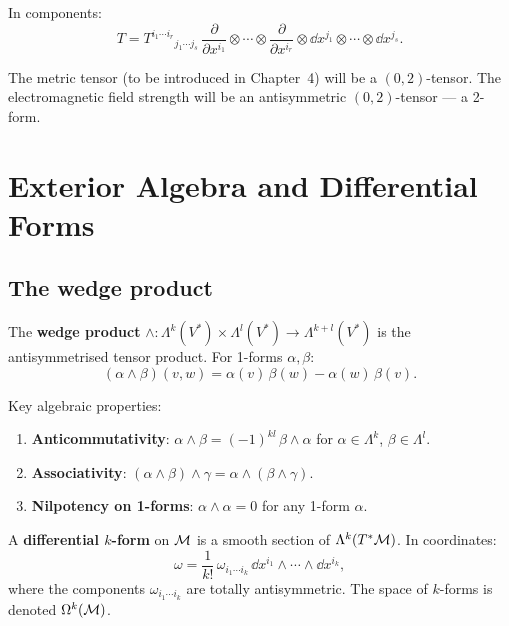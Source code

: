In components:
\begin{equation}
T = T^{i_1 \cdots i_r}{}_{j_1 \cdots j_s}\, \frac{\partial}{\partial x^{i_1}} \otimes \cdots \otimes \frac{\partial}{\partial x^{i_r}} \otimes \dd x^{j_1} \otimes \cdots \otimes \dd x^{j_s}.
\end{equation}

The metric tensor (to be introduced in Chapter~4) will be a $(0,2)$-tensor. The electromagnetic field strength will be an antisymmetric $(0,2)$-tensor --- a 2-form.

\section{Exterior Algebra and Differential Forms}

\subsection{The wedge product}

\begin{definition}
The \textbf{wedge product} $\wedge: \Lambda^k(V^*) \times \Lambda^l(V^*) \to \Lambda^{k+l}(V^*)$ is the antisymmetrised tensor product. For 1-forms $\alpha, \beta$:
\begin{equation}
(\alpha \wedge \beta)(v, w) = \alpha(v)\,\beta(w) - \alpha(w)\,\beta(v).
\end{equation}
\end{definition}

Key algebraic properties:
\begin{enumerate}
\item \textbf{Anticommutativity}: $\alpha \wedge \beta = (-1)^{kl}\,\beta \wedge \alpha$ for $\alpha \in \Lambda^k$, $\beta \in \Lambda^l$.
\item \textbf{Associativity}: $(\alpha \wedge \beta) \wedge \gamma = \alpha \wedge (\beta \wedge \gamma)$.
\item \textbf{Nilpotency on 1-forms}: $\alpha \wedge \alpha = 0$ for any 1-form $\alpha$.
\end{enumerate}

\begin{definition}[$k$-form]
A \textbf{differential $k$-form} on $\mathcal{M}$ is a smooth section of $\Lambda^k(T^*\mathcal{M})$. In coordinates:
\begin{equation}
\omega = \frac{1}{k!}\,\omega_{i_1 \cdots i_k}\,\dd x^{i_1} \wedge \cdots \wedge \dd x^{i_k},
\end{equation}
where the components $\omega_{i_1\cdots i_k}$ are totally antisymmetric. The space of $k$-forms is denoted $\Omega^k(\mathcal{M})$.
\end{definition}

